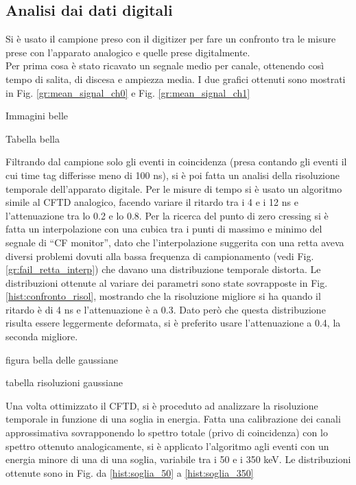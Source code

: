 \subsection{Analisi dai dati digitali}
Si è usato il campione preso con il digitizer per fare un confronto tra le misure prese con l'apparato analogico e quelle prese digitalmente.\\
Per prima cosa è stato ricavato un segnale medio per canale, ottenendo così tempo di salita, di discesa e ampiezza media. I due grafici ottenuti sono mostrati in Fig. \ref{gr:mean_signal_ch0} e Fig. \ref{gr:mean_signal_ch1}

Immagini belle

Tabella bella

Filtrando dal campione solo gli eventi in coincidenza (presa contando gli eventi il cui time tag differisse meno di 100 ns), si è poi fatta un analisi della risoluzione temporale dell'apparato digitale. Per le misure di tempo si è usato un algoritmo simile al CFTD analogico, facendo variare il ritardo tra i 4 e i 12 ns e l'attenuazione tra lo 0.2 e lo 0.8. Per la ricerca del punto di zero cressing si è fatta un interpolazione con una cubica tra i punti di massimo e minimo del segnale di ``CF monitor'', dato che l'interpolazione suggerita con una retta aveva diversi problemi dovuti alla bassa frequenza di campionamento (vedi Fig. \ref{gr:fail_retta_interp}) che davano una distribuzione temporale distorta.
Le distribuzioni ottenute al variare dei parametri sono state sovrapposte in Fig. \ref{hist:confronto_risol}, mostrando che la risoluzione migliore si ha quando il ritardo è di 4 ns e l'attenuazione è a 0.3. Dato però che questa distribuzione risulta essere leggermente deformata, si è preferito usare l'attenuazione a 0.4, la seconda migliore.

figura bella delle gaussiane

tabella risoluzioni gaussiane

Una volta ottimizzato il CFTD, si è proceduto ad analizzare la risoluzione temporale in funzione di una soglia in energia. Fatta una calibrazione dei canali approssimativa sovrapponendo lo spettro totale (privo di coincidenza) con lo spettro ottenuto analogicamente, si è applicato l'algoritmo agli eventi con un energia minore di una di una soglia, variabile tra i 50 e i 350 keV. Le distribuzioni ottenute sono in Fig. da \ref{hist:soglia_50} a \ref{hist:soglia_350}
